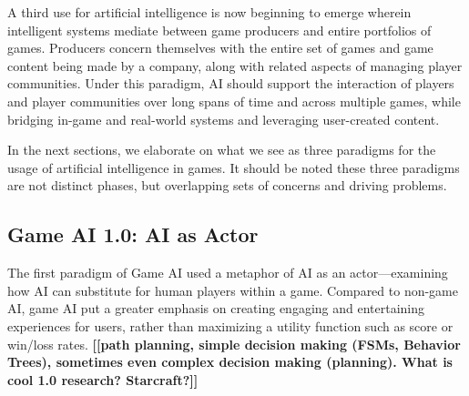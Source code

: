 \documentclass[conference]{IEEEtran}
\newcommand{\mytodo}[1]{\textbf{[[#1]]}}
\begin{document}
A third use for artificial intelligence is now beginning to emerge wherein intelligent systems mediate between game producers and entire portfolios of games.  
Producers concern themselves with the entire set of games and game content being made by a company, along with related aspects of managing player communities.
Under this paradigm, AI should support the interaction of players and player communities over long spans of time and across multiple games, while bridging in-game and real-world systems and leveraging user-created content.

In the next sections, we elaborate on what we see as three paradigms for the usage of artificial intelligence in games.
It should be noted these three paradigms are not distinct phases, but overlapping sets of concerns and driving problems. 

\subsection{Game AI 1.0: AI as Actor}

%
The first paradigm of Game AI used a metaphor of AI as an actor---examining how AI can substitute for human players within a game. 
Compared to non-game AI, game AI put a greater emphasis on creating engaging and entertaining experiences for users, 
rather than maximizing a utility function such as score or win/loss rates. 
\mytodo{path planning, simple decision making (FSMs, Behavior Trees), sometimes even complex decision making (planning). What is cool 1.0 research? Starcraft?}
\end{document}
